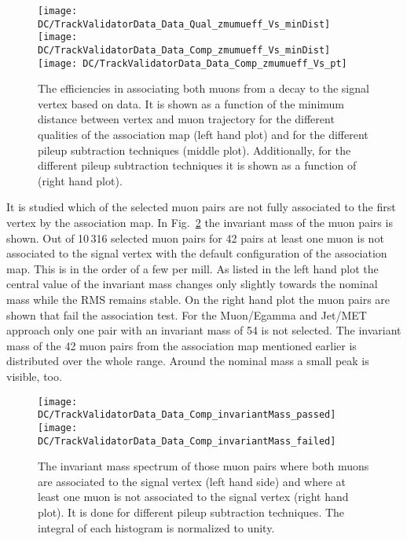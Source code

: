 \begin{figure}[h!t]
  \centering
  \texttt{[image: DC/TrackValidatorData\_Data\_Qual\_zmumueff\_Vs\_minDist]}
  \texttt{[image: DC/TrackValidatorData\_Data\_Comp\_zmumueff\_Vs\_minDist]}
  \texttt{[image: DC/TrackValidatorData\_Data\_Comp\_zmumueff\_Vs\_pt]}
  \caption[Data based association efficiencies of the muon pair coming from a \Zz decay for different qualities of the association map and different pileup subtraction techniques]{The efficiencies in associating both muons from a \Zz decay to the signal vertex based on data. It is shown as a function of the minimum distance between vertex and muon trajectory for the different qualities of the association map (left hand plot) and for the different pileup subtraction techniques (middle plot). Additionally, for the different pileup subtraction techniques it is shown as a function of \pt{} (right hand plot).  \label{plot:DCTVZmmEff}}
\end{figure}

It is studied which of the selected muon pairs are not fully associated to the first vertex by the association map. In Fig.~\ref{plot:DCTVZmmMass} the invariant mass of the muon pairs is shown. Out of 10\,316 selected muon pairs for 42 pairs at least one muon is not associated to the signal vertex with the default configuration of the association map. This is in the order of a few per mill. As listed in the left hand plot the central value of the invariant mass changes only slightly towards the nominal \Zz mass while the RMS remains stable. On the right hand plot the muon pairs are shown that fail the association test. For the Muon/Egamma and Jet/MET approach only one pair with an invariant mass of 54\GeV{} is not selected. The invariant mass of the 42 muon pairs from the association map mentioned earlier is distributed over the whole range. Around the nominal \Zz{} mass a small peak is visible, too.

\begin{figure}[h!t]
  \centering
  \texttt{[image: DC/TrackValidatorData\_Data\_Comp\_invariantMass\_passed]}
  \texttt{[image: DC/TrackValidatorData\_Data\_Comp\_invariantMass\_failed]}
  \caption[Invariant mass spectrum for muon pairs where both are or at least one of them is not associated to the signal vertex for different pileup subtraction techniques]{The invariant mass spectrum of those muon pairs where both muons are associated to the signal vertex (left hand side) and where at least one muon is not associated to the signal vertex (right hand plot). It is done for different pileup subtraction techniques. The integral of each histogram is normalized to unity. \label{plot:DCTVZmmMass}}
\end{figure}


